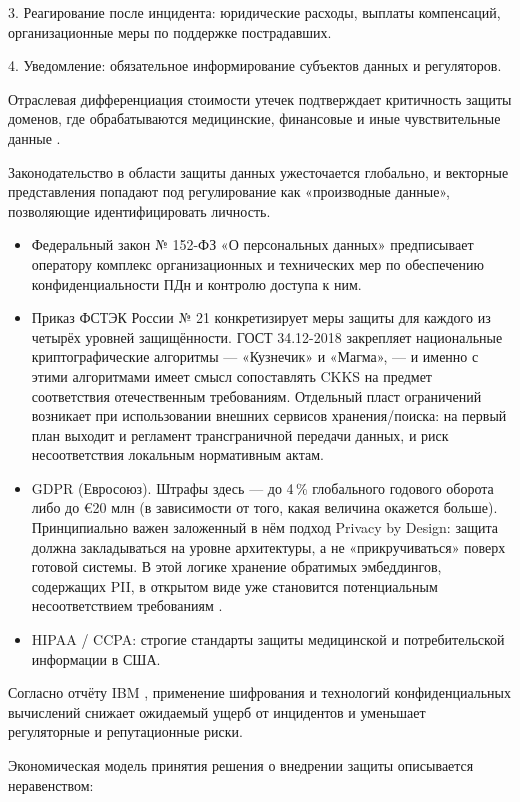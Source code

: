 \documentclass[a4paper, 12pt, oneside, openany]{article}
\begin{document}
3. Реагирование после инцидента: юридические расходы, выплаты компенсаций, организационные меры по поддержке пострадавших.

4. Уведомление: обязательное информирование субъектов данных и регуляторов.

Отраслевая дифференциация стоимости утечек подтверждает критичность защиты доменов, где обрабатываются медицинские, финансовые и иные чувствительные данные \cite{ref9}.

Законодательство в области защиты данных ужесточается глобально, и векторные представления попадают под регулирование как «производные данные», позволяющие идентифицировать личность.

\begin{itemize}
	\item
	Федеральный закон № 152-ФЗ «О персональных данных» \cite{ref59} предписывает оператору комплекс организационных и технических мер по обеспечению конфиденциальности ПДн и контролю доступа к ним. 
	
	\item Приказ ФСТЭК России № 21 \cite{ref61} конкретизирует меры защиты для каждого из четырёх уровней защищённости. ГОСТ 34.12-2018 \cite{ref60} закрепляет национальные криптографические алгоритмы — «Кузнечик» и «Магма», — и именно с этими алгоритмами имеет смысл сопоставлять CKKS на предмет соответствия отечественным требованиям. Отдельный пласт ограничений возникает при использовании внешних сервисов хранения/поиска: на первый план выходит и регламент трансграничной передачи данных, и риск несоответствия локальным нормативным актам.
	\item
	GDPR (Евросоюз). Штрафы здесь — до 4\,\% глобального годового оборота либо до €20 млн (в зависимости от того, какая величина окажется больше). Принципиально важен заложенный в нём подход Privacy by Design: защита должна закладываться на уровне архитектуры, а не «прикручиваться» поверх готовой системы. В этой логике хранение обратимых эмбеддингов, содержащих PII, в открытом виде уже становится потенциальным несоответствием требованиям \cite{ref11}.
	\item
	HIPAA / CCPA: строгие стандарты защиты медицинской и потребительской информации в США.
\end{itemize}

Согласно отчёту IBM \cite{ref9}, применение шифрования и технологий конфиденциальных вычислений снижает ожидаемый ущерб от инцидентов и уменьшает регуляторные и репутационные риски.

Экономическая модель принятия решения о внедрении защиты описывается неравенством:
\end{document}
